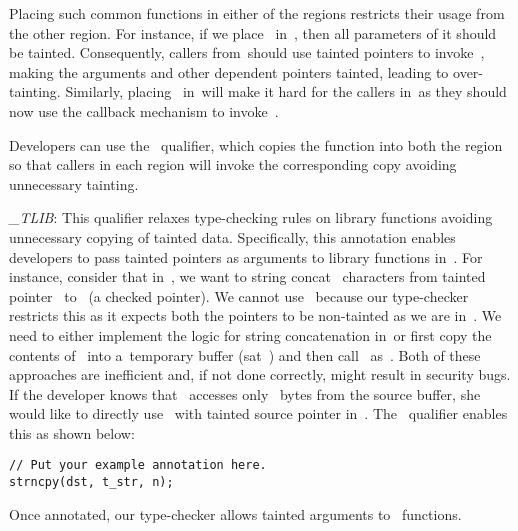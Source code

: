 Placing such common functions in either of the regions restricts their usage from the other region. For instance, if we place~ in~\ucregion, then all parameters of it should be tainted. Consequently, callers from~\cregion should use tainted pointers to invoke~, making the arguments and other dependent pointers tainted, leading to over-tainting.
Similarly, placing~ in~\cregion will make it hard for the callers in~\ucregion as they should now use the callback mechanism to invoke~.

Developers can use the~ qualifier, which copies the function into both the region so that callers in each region will invoke the corresponding copy avoiding unnecessary tainting. 

\noindent\emph{\_TLIB}:
This qualifier relaxes type-checking rules on library functions avoiding unnecessary copying of tainted data.
Specifically, this annotation enables developers to pass tainted pointers as arguments to library functions in~\cregion.
For instance, consider that in~\cregion, we want to string concat~ characters from tainted pointer~ to~ (a checked pointer).
We cannot use~ because our type-checker restricts this as it expects both the pointers to be non-tainted as we are in~\cregion.
We need to either implement the logic for string concatenation in~\cregion or first copy the contents of~ into a~\cregion temporary buffer (sat~) and then call~ as~.
Both of these approaches are inefficient and, if not done correctly, might result in security bugs.
If the developer knows that~ accesses only~ bytes from the source buffer, she would like to directly use~ with tainted source pointer in~\cregion.
The~ qualifier enables this as shown below:
\begin{verbatim}
// Put your example annotation here.
strncpy(dst, t_str, n);
\end{verbatim}
Once annotated, our type-checker allows tainted arguments to~ functions.

